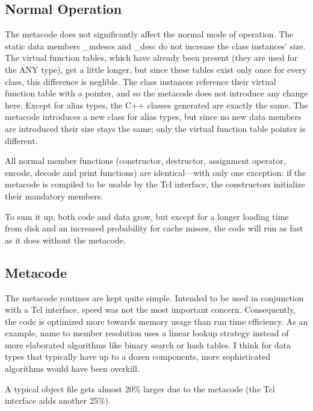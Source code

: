 \subsection{Normal Operation}

The metacode does not significantly affect the normal mode of operation.
The static data members {\C \_mdescs} and {\C \_desc} do not increase the class instances' size.
The virtual function tables, which have already been present (they are used for the ANY type), get a little longer, but since these tables exist only once for every class, this difference is neglible.
The class instances reference their virtual function table with a pointer, and so the metacode does not introduce any change here.
Except for alias types, the C++ classes generated are exactly the same.
The metacode introduces a new class for alias types, but since no new data members are introduced their size stays the same; only the virtual function table pointer is different.

All normal member functions (constructor, destructor, assignment operator, encode, decode and print functions) are identical---with only one exception: if the metacode is compiled to be usable by the Tcl interface, the constructors initialize their mandatory members.

To sum it up, both code and data grow, but except for a longer loading time from disk and an increased probability for cache misses, the code will run as fast as it does without the metacode.

\subsection{Metacode}

The metacode routines are kept quite simple.
Intended to be used in conjunction with a Tcl interface, speed was not the most important concern.
Consequently, the code is optimized more towards memory usage than run time efficiency.
As an example, name to member resolution uses a linear lookup strategy instead of more elaborated algorithms like binary search or hash tables.
I think for data types that typically have up to a dozen components, more sophisticated algorithms would have been overkill.

A typical object file gets almost 20\% larger due to the metacode (the Tcl interface adds another 25\%).

